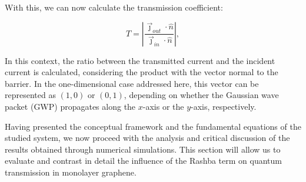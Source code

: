 With this, we can now calculate the transmission coefficient:

\begin{equation}
    \label{eq:transmissionCoef}
    T = \left| \frac{\vec{\jmath}_{out}\cdot\hat{n}}{\vec{\jmath}_{in}\cdot\hat{n}} \right|,
\end{equation}

\noindent In this context, the ratio between the transmitted current and the incident current is calculated, considering the product with the vector normal to the barrier.
In the one-dimensional case addressed here, this vector can be represented as $(1,0)$ or $(0,1)$, depending on whether the Gaussian wave packet (GWP) propagates along the $x$-axis or the $y$-axis, respectively.

Having presented the conceptual framework and the fundamental equations of the studied system, we now proceed with the analysis and critical discussion of the results obtained through numerical simulations.
This section will allow us to evaluate and contrast in detail the influence of the Rashba term on quantum transmission in monolayer graphene.
